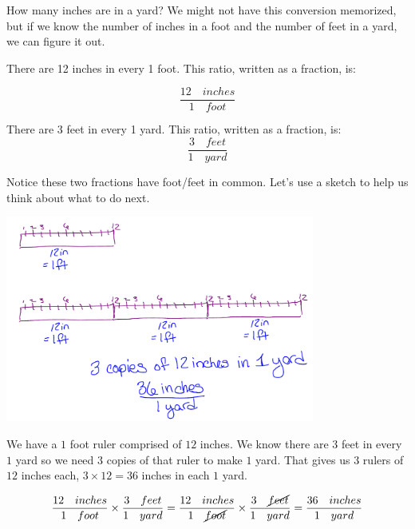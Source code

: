 \documentclass{ximera}
\begin{document}
\begin{example} How many inches are in a yard? We might not have this conversion memorized, but if we know the number of inches in a foot and the number of feet in a yard, we can figure it out.

\begin{explanation}
There are 12 inches in every 1 foot. This ratio, written as a fraction, is: 

$$\frac{12 \quad inches}{1 \quad foot}$$

There are 3 feet in every 1 yard. This ratio, written as a fraction, is:
$$  \frac{3 \quad feet}{1 \quad yard} $$

Notice these two fractions have foot/feet in common. Let's use a sketch to help us think about what to do next.

\begin{image}
    \includegraphics[width=4in]{inchestoyard.png}
\end{image}

We have a $1$ foot ruler comprised of $12$ inches. We know there are $3$ feet in every $1$ yard so we need $3$ copies of that ruler to make $1$ yard. That gives us $3$ rulers of $12$ inches each, $3 \times 12=36$ inches in each $1$ yard.


$$
\frac{12 \quad inches}{1 \quad foot} \times \frac{3 \quad feet}{1 \quad yard} = \frac{12 \quad inches}{1 \quad \cancel{foot}} \times \frac{3 \quad \cancel{feet}}{1 \quad yard} = \frac{36 \quad inches}{1 \quad yard}
$$

\end{explanation}
\end{example}
\end{document}

